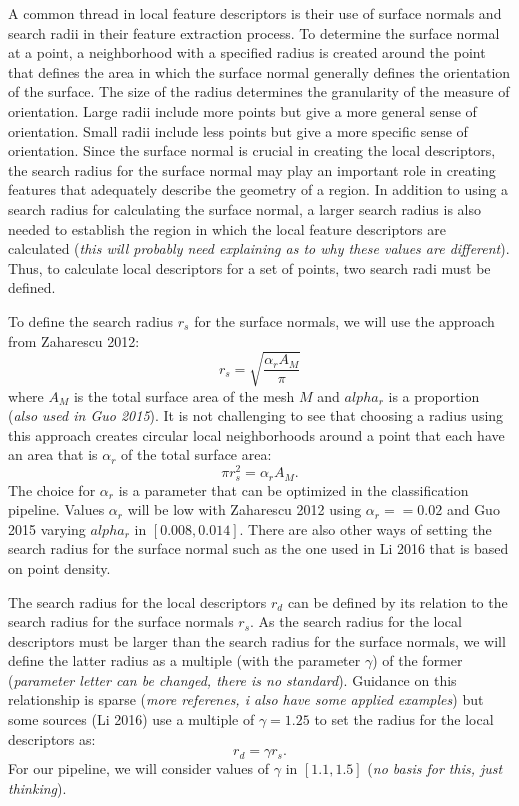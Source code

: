 \documentclass[11pt]{article}
\theoremstyle{definition}
\begin{document}
A common thread in local feature descriptors is their use of surface normals and search radii in their feature extraction process. To determine the surface normal at a point, a neighborhood with a specified radius is created around the point that defines the area in which the surface normal generally defines the orientation of the surface. The size of the radius determines the granularity of the measure of orientation. Large radii include more points but give a more general sense of orientation. Small radii include less points but give a more specific sense of orientation. Since the surface normal is crucial in creating the local descriptors, the search radius for the surface normal may play an important role in creating features that adequately describe the geometry of a region. In addition to using a search radius for calculating the surface normal, a larger search radius is also needed to establish the region in which the local feature descriptors are calculated (\textit{this will probably need explaining as to why these values are different}). Thus, to calculate local descriptors for a set of points, two search radi must be defined. 

To define the search radius $r_s$ for the surface normals, we will use the approach from Zaharescu 2012:
$$r_s = \sqrt{\frac{\alpha_r A_M}{\pi}}$$
where $A_M$ is the total surface area of the mesh $M$ and $alpha_r$ is a proportion (\textit{also used in Guo 2015}). It is not challenging to see that choosing a radius using this approach creates circular local neighborhoods around a point that each have an area that is $\alpha_r$ of the total surface area:
$$\pi r_s^2 = \alpha_r A_M.$$
The choice for $\alpha_r$ is a parameter that can be optimized in the classification pipeline. Values $\alpha_r$ will be low with Zaharescu 2012 using $\alpha_r == 0.02$ and Guo 2015 varying $alpha_r$ in $[0.008, 0.014]$. There are also other ways of setting the search radius for the surface normal such as the one used in Li 2016 that is based on point density. 

The search radius for the local descriptors $r_d$ can be defined by its relation to the search radius for the surface normals $r_s$. As the search radius for the local descriptors must be larger than the search radius for the surface normals, we will define the latter radius as a multiple (with the parameter $\gamma$) of the former (\textit{parameter letter can be changed, there is no standard}). Guidance on this relationship is sparse (\textit{more referenes, i also have some applied examples}) but some sources (Li 2016) use a multiple of $\gamma = 1.25$ to set the radius for the local descriptors as:
$$r_d = \gamma r_s.$$
For our pipeline, we will consider values of $\gamma$ in $[1.1, 1.5]$ (\textit{no basis for this, just thinking}). 
\end{document}
